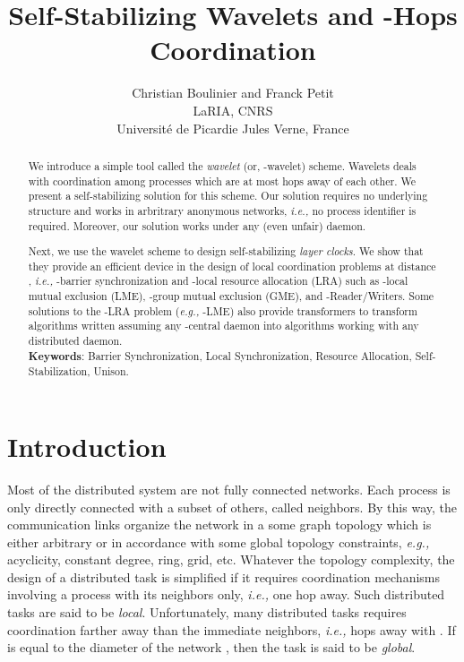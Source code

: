 \documentclass[11pt]{article}
\newcommand{\eg}{\emph{e.g., }}
\newcommand{\ie}{\emph{i.e., }}
\begin{document}
\title{ Self-Stabilizing Wavelets and -Hops Coordination}



\author{
Christian Boulinier and Franck Petit\\
LaRIA, CNRS \\
Universit\'{e} de Picardie Jules Verne, France\\
}

\date{}
\maketitle

\footnotesize
\begin{abstract}
We introduce a simple tool called the \emph{wavelet} (or, -wavelet) scheme.  
Wavelets deals with coordination among processes which are at most
 hops away of each other.  
We present a self-stabilizing solution for this scheme.  Our solution requires no underlying 
structure and works in arbritrary anonymous networks, \ie no process identifier is required.  
Moreover, our solution works under any (even unfair) daemon. 

Next, we use the wavelet scheme to design self-stabilizing \emph{layer clocks}.  
We show that they provide an efficient device in the design of local coordination 
problems at distance , \ie -barrier synchronization and
-local resource allocation (LRA) such as -local mutual exclusion (LME), 
-group mutual exclusion (GME), and -Reader/Writers.  Some solutions to 
the -LRA problem (\eg -LME) also provide transformers 
to transform algorithms written assuming any -central daemon into algorithms working 
with any distributed daemon.  
\\

\textbf{Keywords}: Barrier Synchronization,  Local Synchronization, Resource Allocation, Self-Stabili\-zation, Unison. \end{abstract}
\normalsize





\section{Introduction}

Most of the distributed system are not fully connected networks.  
Each process is only directly connected with a subset of others, called neighbors.  By this way, 
the communication links organize the network in a some graph topology which is either arbitrary or 
in accordance with some global topology constraints, \eg acyclicity, constant degree, ring, grid, etc.  
Whatever the topology complexity, the design 
of a distributed task is simplified if it requires coordination mechanisms involving a process with
its neighbors only, \ie  one hop away.  Such distributed tasks are said to be \emph{local}.  
Unfortunately, many distributed tasks requires coordination farther away than the immediate neighbors, 
\ie  hops away with .  If  is equal to the diameter of the network , then
the task is said to be \emph{global}. 
\end{document}

